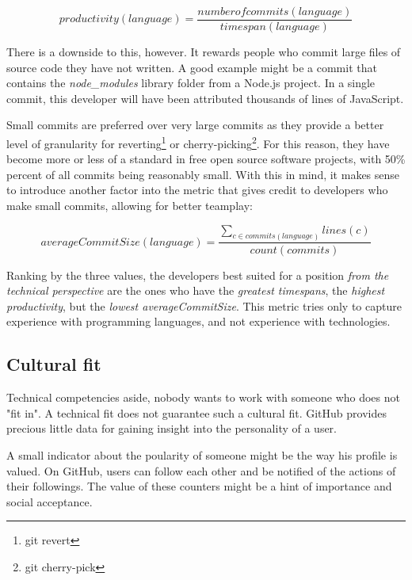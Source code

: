 \begin{equation}
productivity(language) = \frac{numberofcommits(language)}{timespan(language)}
\label{eq:productivity}
\end{equation}

There is a downside to this, however. It rewards people who commit large files of source code they have not written. A good example might be a commit that contains the \textit{node\_modules} library folder from a Node.js project. In a single commit, this developer will have been attributed thousands of lines of JavaScript.

Small commits are preferred \cite{so:commitsize} over very large commits as they provide a better level of granularity for reverting\footnote{git revert} or cherry-picking\footnote{git cherry-pick}. For this reason, they have become more or less of a standard in free  open source software projects, with 50\% percent of all commits being reasonably small\cite{rsk:2014}. With this in mind, it makes sense to introduce another factor into the metric that gives credit to developers who make small commits, allowing for better teamplay:

\begin{equation}
averageCommitSize(language) = \frac{\sum_{c \in commits(language)} lines(c)}{count(commits)}
\label {eq:avgcommitsize}
\end{equation}

Ranking by the three values, the developers best suited for a position \textit{from the technical perspective} are the ones who have the \textit{greatest timespans}, the \textit{highest productivity}, but the \textit{lowest averageCommitSize}. This metric tries only to capture experience with programming languages, and not experience with technologies.

\subsection{Cultural fit}
Technical competencies aside, nobody wants to work with someone who does not "fit in". A technical fit does not guarantee such a cultural fit. GitHub provides precious little data for gaining insight into the personality of a user.
\newline

A small indicator about the poularity of someone might be the way his profile is valued. On GitHub, users can follow each other and be notified of the actions of their followings. The value of these counters might be a hint of importance and social acceptance.
\newline

